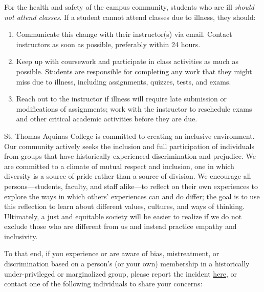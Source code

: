 \documentclass[11pt,letterpaper]{article}
\begin{document}

For the health and safety of the campus community, students who are ill {\itshape should not attend classes}. If a student cannot attend classes due to illness, they should:

	\begin{enumerate}[1.]
	\item Communicate this change with their instructor(s) via email. Contact instructors as soon as possible, preferably within 24 hours.
	\item Keep up with coursework and participate in class activities as much as possible. Students are responsible for completing any work that they might miss due to illness, including assignments, quizzes, tests, and exams.
	\item Reach out to the instructor if illness will require late submission or modifications of assignments; work with the instructor to reschedule exams and other critical academic activities before they are due.
	\end{enumerate} \pspace




St. Thomas Aquinas College is committed to creating an inclusive environment. Our community actively seeks the inclusion and full participation of individuals from groups that have historically experienced discrimination and prejudice. We are committed to a climate of mutual respect and inclusion, one in which diversity is a source of pride rather than a source of division. We encourage all persons---students, faculty, and staff alike---to reflect on their own experiences to explore the ways in which others’ experiences can and do differ; the goal is to use this reflection to learn about different values, cultures, and ways of thinking. Ultimately, a just and equitable society will be easier to realize if we do not exclude those who are different from us and instead practice empathy and inclusivity. \pspace

To that end, if you experience or are aware of bias, mistreatment, or discrimination based on a person's (or your own) membership in a historically under-privileged or marginalized group, please report the incident \href{https://stac.edu/student-life/social-justice-equity/report-incident/}{here}, or contact one of the following individuals to share your concerns: \pspace
\end{document}
